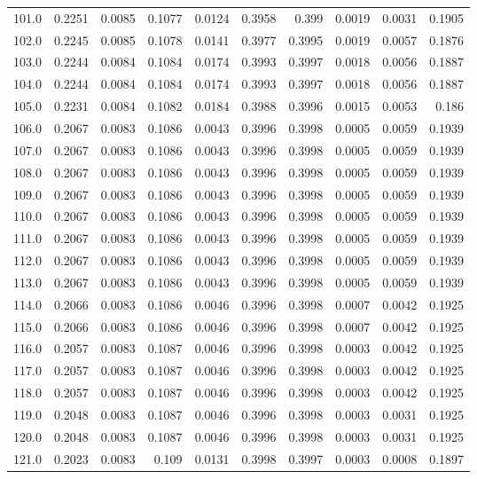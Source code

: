 \begin{longtable}{lrrrrrrrrr}
101.0 & 0.2251 & 0.0085 & 0.1077 & 0.0124 & 0.3958 & 0.399 & 0.0019 & 0.0031 & 0.1905 \\
102.0 & 0.2245 & 0.0085 & 0.1078 & 0.0141 & 0.3977 & 0.3995 & 0.0019 & 0.0057 & 0.1876 \\
103.0 & 0.2244 & 0.0084 & 0.1084 & 0.0174 & 0.3993 & 0.3997 & 0.0018 & 0.0056 & 0.1887 \\
104.0 & 0.2244 & 0.0084 & 0.1084 & 0.0174 & 0.3993 & 0.3997 & 0.0018 & 0.0056 & 0.1887 \\
105.0 & 0.2231 & 0.0084 & 0.1082 & 0.0184 & 0.3988 & 0.3996 & 0.0015 & 0.0053 & 0.186 \\
106.0 & 0.2067 & 0.0083 & 0.1086 & 0.0043 & 0.3996 & 0.3998 & 0.0005 & 0.0059 & 0.1939 \\
107.0 & 0.2067 & 0.0083 & 0.1086 & 0.0043 & 0.3996 & 0.3998 & 0.0005 & 0.0059 & 0.1939 \\
108.0 & 0.2067 & 0.0083 & 0.1086 & 0.0043 & 0.3996 & 0.3998 & 0.0005 & 0.0059 & 0.1939 \\
109.0 & 0.2067 & 0.0083 & 0.1086 & 0.0043 & 0.3996 & 0.3998 & 0.0005 & 0.0059 & 0.1939 \\
110.0 & 0.2067 & 0.0083 & 0.1086 & 0.0043 & 0.3996 & 0.3998 & 0.0005 & 0.0059 & 0.1939 \\
111.0 & 0.2067 & 0.0083 & 0.1086 & 0.0043 & 0.3996 & 0.3998 & 0.0005 & 0.0059 & 0.1939 \\
112.0 & 0.2067 & 0.0083 & 0.1086 & 0.0043 & 0.3996 & 0.3998 & 0.0005 & 0.0059 & 0.1939 \\
113.0 & 0.2067 & 0.0083 & 0.1086 & 0.0043 & 0.3996 & 0.3998 & 0.0005 & 0.0059 & 0.1939 \\
114.0 & 0.2066 & 0.0083 & 0.1086 & 0.0046 & 0.3996 & 0.3998 & 0.0007 & 0.0042 & 0.1925 \\
115.0 & 0.2066 & 0.0083 & 0.1086 & 0.0046 & 0.3996 & 0.3998 & 0.0007 & 0.0042 & 0.1925 \\
116.0 & 0.2057 & 0.0083 & 0.1087 & 0.0046 & 0.3996 & 0.3998 & 0.0003 & 0.0042 & 0.1925 \\
117.0 & 0.2057 & 0.0083 & 0.1087 & 0.0046 & 0.3996 & 0.3998 & 0.0003 & 0.0042 & 0.1925 \\
118.0 & 0.2057 & 0.0083 & 0.1087 & 0.0046 & 0.3996 & 0.3998 & 0.0003 & 0.0042 & 0.1925 \\
119.0 & 0.2048 & 0.0083 & 0.1087 & 0.0046 & 0.3996 & 0.3998 & 0.0003 & 0.0031 & 0.1925 \\
120.0 & 0.2048 & 0.0083 & 0.1087 & 0.0046 & 0.3996 & 0.3998 & 0.0003 & 0.0031 & 0.1925 \\
121.0 & 0.2023 & 0.0083 & 0.109 & 0.0131 & 0.3998 & 0.3997 & 0.0003 & 0.0008 & 0.1897 \\

\end{longtable}
